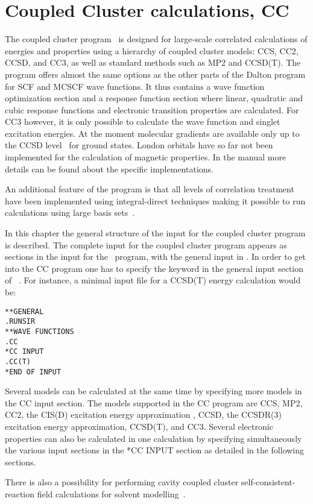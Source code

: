 \chapter{Coupled Cluster calculations, CC}\label{ch:CC}

The coupled cluster program \cc\ is designed for large-scale
correlated calculations of energies and properties using a
hierarchy of coupled cluster models: CCS, CC2, CCSD, and CC3, as well as standard methods such as MP2 and CCSD(T).
The program offers almost the same options as the other
parts of the Dalton program for SCF and MCSCF wave functions.
It thus contains a wave function optimization section and 
a response function section
where linear, quadratic and cubic response functions and electronic
transition properties are calculated.
For CC3 however, it is only possible to calculate the wave function and 
singlet excitation energies. 
At the moment molecular gradients are available 
only up to the CCSD level~\cite{} for ground states.  
London orbitals have so far not been implemented 
for the calculation of magnetic properties.
In the manual more details can be found about the specific implementations.

An additional feature of the program is that all levels of correlation
treatment have been implemented using integral-direct techniques making
it possible to run calculations using large basis sets~\cite{}.  

In this chapter the general structure of the input for the
coupled cluster program is described.
The complete input for the coupled cluster program appears as
sections in the input for the \sir\ program, with the general
input in . In order to get into the CC program
one has to specify the  keyword in the general input
section of \sir\ . For instance, a minimal
input file for a CCSD(T) energy calculation would be:
\begin{verbatim}
**GENERAL
.RUNSIR
**WAVE FUNCTIONS
.CC
*CC INPUT
.CC(T)
*END OF INPUT
\end{verbatim}

Several models can be calculated at the same time by specifying more models
in the CC input section. 
The models supported in the CC program are 
CCS\cite{Christiansen:CPL243},
MP2\cite{Moller34},
CC2\cite{Christiansen:CPL243},
the CIS(D) excitation energy approximation \cite{Head-Gordon:94},
CCSD\cite{Purvis82},
the CCSDR(3) excitation energy approximation\cite{Christiansen:PERTURBATIVE_TRIPLES}, 
CCSD(T)\cite{Raghavachari89}, and CC3\cite{Christiansen:JCP103,Koch:JCP106}.
Several electronic properties can also 
be calculated in one calculation by specifying simultaneously 
the various input sections in the *CC INPUT section
as detailed in the following sections.

There is also a possibility for performing cavity coupled cluster
self-consistent-reaction field calculations for solvent modelling~\cite{}.
